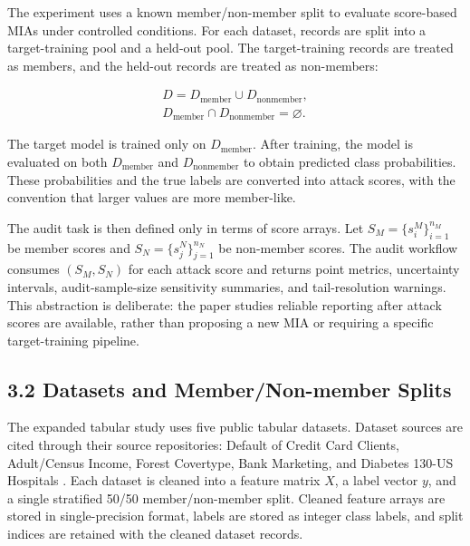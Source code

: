 \documentclass[
  10pt,
  twocolumn]{article}
\begin{document}
The experiment uses a known member/non-member split to evaluate score-based MIAs under controlled conditions. For each dataset, records are split into a target-training pool and a held-out pool. The target-training records are treated as members, and the held-out records are treated as non-members:

\[
\begin{gathered}
D = D_{\mathrm{member}} \cup D_{\mathrm{nonmember}},\\
D_{\mathrm{member}} \cap D_{\mathrm{nonmember}} = \varnothing .
\end{gathered}
\]

The target model is trained only on \(D_{\mathrm{member}}\). After training, the model is evaluated on both \(D_{\mathrm{member}}\) and \(D_{\mathrm{nonmember}}\) to obtain predicted class probabilities. These probabilities and the true labels are converted into attack scores, with the convention that larger values are more member-like.

The audit task is then defined only in terms of score arrays. Let \(S_M = \{s_i^M\}_{i=1}^{n_M}\) be member scores and \(S_N = \{s_j^N\}_{j=1}^{n_N}\) be non-member scores. The audit workflow consumes \((S_M, S_N)\) for each attack score and returns point metrics, uncertainty intervals, audit-sample-size sensitivity summaries, and tail-resolution warnings. This abstraction is deliberate: the paper studies reliable reporting after attack scores are available, rather than proposing a new MIA or requiring a specific target-training pipeline.

\hypertarget{datasets-and-membernon-member-splits}{%
\subsection{3.2 Datasets and Member/Non-member Splits}\label{datasets-and-membernon-member-splits}}

The expanded tabular study uses five public tabular datasets. Dataset sources are cited through their source repositories: Default of Credit Card Clients, Adult/Census Income, Forest Covertype, Bank Marketing, and Diabetes 130-US Hospitals \cite{ref-26,ref-27,ref-28,ref-29,ref-30}. Each dataset is cleaned into a feature matrix \(X\), a label vector \(y\), and a single stratified 50/50 member/non-member split. Cleaned feature arrays are stored in single-precision format, labels are stored as integer class labels, and split indices are retained with the cleaned dataset records.
\end{document}
